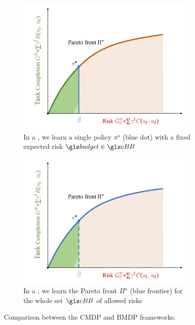 \begin{figure}[ht]
\begin{subfigure}[t]{0.48\linewidth}
	\includegraphics[width=\linewidth]{img/pareto2}
	\caption{In a , we learn a single policy $\pi^\star$ (blue dot) with a fixed expected risk $\budget\in\budgetspace$}
	\label{fig:cmdp}
\end{subfigure}\hfill
\begin{subfigure}[t]{0.48\linewidth}
	\includegraphics[width=\linewidth]{img/pareto3}
	\caption{In a , we learn the Pareto front $\Pi^\star$ (blue frontier) for the whole set $\budgetspace$ of allowed risks}
	\label{fig:bmdp}
\end{subfigure}
\caption{Comparison between the \gls{CMDP} and \gls{BMDP} frameworks.}
\end{figure}

